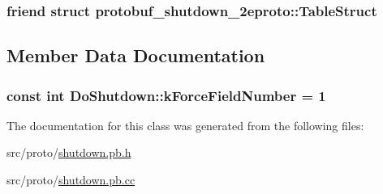 \subsubsection[{\texorpdfstring{protobuf\+\_\+shutdown\+\_\+2eproto\+::\+Table\+Struct}{protobuf_shutdown_2eproto::TableStruct}}]{\setlength{\rightskip}{0pt plus 5cm}friend struct {\bf protobuf\+\_\+shutdown\+\_\+2eproto\+::\+Table\+Struct}\hspace{0.3cm}{\ttfamily [friend]}}\hypertarget{class_do_shutdown_a777ca90370183861c7fa0d95a1e958d6}{}\label{class_do_shutdown_a777ca90370183861c7fa0d95a1e958d6}


\subsection{Member Data Documentation}
\subsubsection[{\texorpdfstring{k\+Force\+Field\+Number}{kForceFieldNumber}}]{\setlength{\rightskip}{0pt plus 5cm}const int Do\+Shutdown\+::k\+Force\+Field\+Number = 1\hspace{0.3cm}{\ttfamily [static]}}\hypertarget{class_do_shutdown_a2e2fc6a82227b39713387dd9d6ebb3c1}{}\label{class_do_shutdown_a2e2fc6a82227b39713387dd9d6ebb3c1}


The documentation for this class was generated from the following files\+:\begin{DoxyCompactItemize}
\item 
src/proto/\hyperlink{shutdown_8pb_8h}{shutdown.\+pb.\+h}\item 
src/proto/\hyperlink{shutdown_8pb_8cc}{shutdown.\+pb.\+cc}\end{DoxyCompactItemize}
